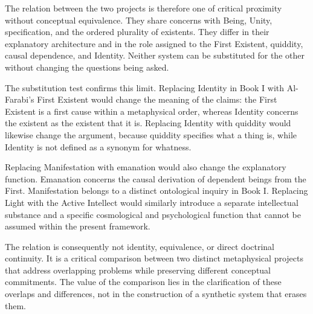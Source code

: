 \label{para:VS.B01.P01.C08.S12.SS15.P003}

The relation between the
two projects is therefore
one of critical proximity
without conceptual equivalence.
They share concerns with
Being, Unity, specification,
and the ordered plurality
of existents. They differ
in their explanatory
architecture and in the
role assigned to the
First Existent, quiddity,
causal dependence, and
Identity. Neither system
can be substituted for
the other without changing
the questions being asked.

\label{para:VS.B01.P01.C08.S12.SS15.P004}

The substitution test confirms
this limit. Replacing
Identity in Book I with
Al-Farabi's First Existent
would change the meaning
of the claims: the First
Existent is a first cause
within a metaphysical
order, whereas Identity
concerns the existent
as the existent that
it is. Replacing Identity
with quiddity would
likewise change the
argument, because quiddity
specifies what a thing
is, while Identity is
not defined as a synonym
for whatness.

\label{para:VS.B01.P01.C08.S12.SS15.P005}

Replacing Manifestation
with emanation would
also change the explanatory
function. Emanation concerns
the causal derivation
of dependent beings from
the First. Manifestation
belongs to a distinct
ontological inquiry in
Book I. Replacing Light
with the Active Intellect
would similarly introduce
a separate intellectual
substance and a specific
cosmological and
psychological function
that cannot be assumed
within the present
framework.

\label{para:VS.B01.P01.C08.S12.SS15.P006}

The relation is consequently
not identity, equivalence,
or direct doctrinal
continuity. It is a
critical comparison
between two distinct
metaphysical projects
that address overlapping
problems while preserving
different conceptual
commitments. The value
of the comparison lies
in the clarification
of these overlaps and
differences, not in
the construction of
a synthetic system
that erases them.



